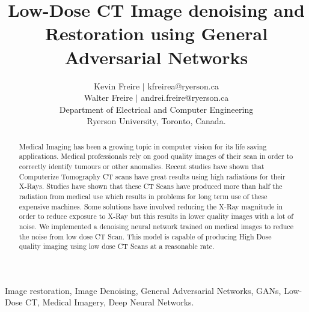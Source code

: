 \documentclass[journal]{IEEEtran}
\begin{document}
\title{Low-Dose CT Image denoising and Restoration using General Adversarial Networks}

\author{Kevin Freire $|$ kfreirea@ryerson.ca\\
Walter Freire $|$ andrei.freire@ryerson.ca \\
Department of Electrical and Computer Engineering\\
Ryerson University, Toronto, Canada.}
\maketitle


\begin{abstract}
Medical Imaging has been a growing topic in computer vision for its life saving applications.  Medical professionals rely on good quality images of their scan in order to correctly identify tumours or other anomalies.  Recent studies have shown that Computerize Tomography CT scans have great results using high radiations for their X-Rays.  Studies have shown that these CT Scans have produced more than half the radiation from medical use which results in problems for long term use of these expensive machines.  Some solutions have involved reducing the X-Ray magnitude in order to reduce exposure to X-Ray but this results in lower quality images with a lot of noise.  We implemented a denoising neural network trained on medical images to reduce the noise from low dose CT Scan.  This model is capable of producing High Dose quality imaging using low dose CT Scans at a reasonable rate.


\end{abstract}

\begin{IEEEkeywords}
Image restoration, Image Denoising, General Adversarial Networks, GANs, Low-Dose CT, Medical Imagery, Deep Neural Networks.
\end{IEEEkeywords}

\end{document}
